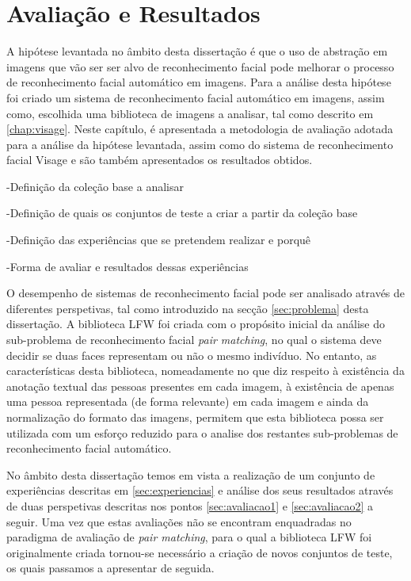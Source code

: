 \chapter{Avaliação e Resultados} \label{chap:resultados}

A hipótese levantada no âmbito desta dissertação é que o uso de abstração em imagens que vão ser ser alvo de reconhecimento facial pode melhorar o processo de reconhecimento facial automático em imagens. Para a análise desta hipótese foi criado um sistema de reconhecimento facial automático em imagens, assim  como, escolhida uma biblioteca de imagens a analisar, tal como descrito em \ref{chap:visage}. Neste capítulo, é apresentada a metodologia de avaliação adotada para a análise da hipótese levantada, assim como do sistema de reconhecimento facial Visage e são também apresentados os resultados obtidos.



-Definição da coleção base a analisar

-Definição de quais os conjuntos de teste a criar a partir da coleção base

-Definição das experiências que se pretendem realizar e porquê

-Forma de avaliar e resultados dessas experiências

O desempenho de sistemas de reconhecimento facial pode ser analisado através de diferentes perspetivas, tal como introduzido na secção \ref{sec:problema} desta dissertação. A biblioteca LFW foi criada com o propósito inicial da análise do sub-problema de reconhecimento facial \textit{pair matching}, no qual o sistema deve decidir se duas faces representam ou não o mesmo indivíduo. No entanto, as características desta biblioteca, nomeadamente no que diz respeito à existência da anotação textual das pessoas presentes em cada imagem, à existência de apenas uma pessoa representada (de forma relevante) em cada imagem e ainda da normalização do formato das imagens, permitem que esta biblioteca possa ser utilizada com um esforço reduzido para o analise dos restantes sub-problemas de reconhecimento facial automático.

No âmbito desta dissertação temos em vista a realização de um conjunto de experiências descritas em \ref{sec:experiencias} e análise dos seus resultados através de duas perspetivas descritas nos pontos \ref{sec:avaliacao1} e \ref{sec:avaliacao2} a seguir. Uma vez que estas avaliações não se encontram enquadradas no paradigma de avaliação de \textit{pair matching}, para o qual a biblioteca LFW foi originalmente criada tornou-se necessário a criação de novos conjuntos de teste, os quais passamos a apresentar de seguida.

